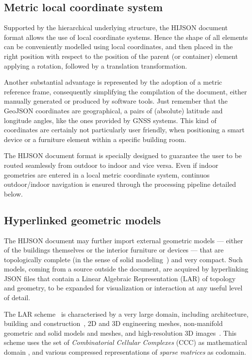 \subsection{Metric local coordinate system}\label{metric-local-coordinate-system}

Supported by the hierarchical underlying structure, the HIJSON document format allows 
the use of local coordinate systems. Hence the shape of all elements can 
be conveniently modelled using local coordinates, and then placed in the right position 
with respect to the position of the parent (or container) element applying a rotation, followed by a
translation transformation.

Another substantial advantage is represented by the adoption of a metric
reference frame,  consequently simplifying the compilation of the document,
either manually generated or produced by software tools. Just remember that
the GeoJSON coordinates are geographical, a pairs of (absolute) latitude
and longitude angles, like the ones provided by GNSS systems. This kind of
coordinates  are certainly not particularly user friendly, when positioning a
smart device or a furniture element within a specific building room.

The HIJSON document format is specially designed to guarantee the user to be routed seamlessly 
from outdoor to indoor and vice versa. Even if indoor geometries are entered in a local metric 
coordinate system, continuos outdoor/indoor navigation is ensured through the processing pipeline
detailed below.

\subsection{Hyperlinked geometric models}\label{optional-lar}

The HIJSON document may further import external geometric models --- either of the buildings themselves or the interior furniture or devices --- that are topologically complete (in the sense of solid modeling~\cite{Requicha:1980:RRS:356827.356833}) and very compact. 
Such models, coming from a source outside the document, are acquired by hyperlinking JSON files that contain a Linear Algebraic Representation (LAR) of topology and geometry, to be expanded for visualization or interaction at any useful level of detail. 

The LAR scheme~\cite{Dicarlo:2014:TNL:2543138.2543294} is characterised by a very large domain, including architecture, building and construction~\cite{paoluzziMS:2014}, 2D and 3D engineering meshes, non-manifold geometric and solid models and meshes, and high-resolution 3D images~\cite{cadanda:2015}. This scheme uses the set of \emph{Combinatorial Cellular Complexes} (CCC) as mathematical domain
\cite{Basak:2010}, and various compressed representations of \emph{sparse matrices} \cite{gemmexp} as codomain. 

